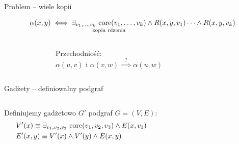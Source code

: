 
\begin{frame}{Problem -- wiele kopii}

    \[ \alpha(x, y) \iff \underset{\text{kopia rdzenia}}{\exists_{v_1, \dots, v_k} \ \text{core}(v_1, \dots, v_k)} \land R(x, y, v_1) \dots \land R(x, y, v_k) \]

\begin{columns}
    \begin{figure}
        \centering
        
    \end{figure}

\vspace{1em}
    \!Przechodniość: \\[-1.25em]
    \[ \alpha(u,v) \text{ i } \alpha(v, w) \overset{\text{?}}{\implies} \alpha(u, w) \]

\end{columns}

\end{frame}


\begin{frame}{Gadżety -- definiowalny podgraf}

\begin{columns}
    

    Definiujemy gadżetowo \(G'\) podgraf \(G=(V,E):\)
    \begin{align*}
        &V'(x) \equiv \exists_{v_1, v_2, v_3} \ \text{core}(v_1, v_2, v_3) \land E(x, v_1) \\
        &E'(x,y) \equiv V'(x) \land V'(y) \land E(x,y)
    \end{align*}
\end{columns}

\end{frame}
